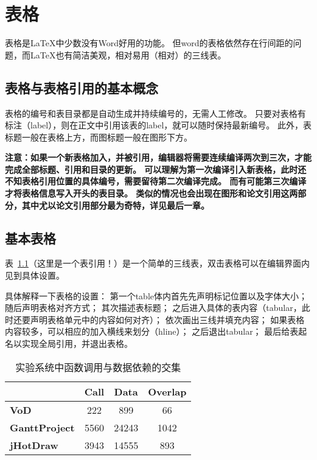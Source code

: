 \chapter{表格}

表格是LaTeX中少数没有Word好用的功能。
但word的表格依然存在行间距的问题，而LaTeX也有简洁美观，相对易用（相对）的三线表。

\section{表格与表格引用的基本概念}
表格的编号和表目录都是自动生成并持续编号的，无需人工修改。
只要对表格有标注（label），则在正文中引用该表的label，就可以随时保持最新编号。
此外，表标题一般在表格上方，而图标题一般在图形下方。

\textbf{注意：如果一个新表格加入，并被引用，编辑器将需要连续编译两次到三次，才能完成全部标题、引用和目录的更新。
可以理解为第一次编译引入新表格，此时还不知表格引用位置的具体编号，需要留待第二次编译完成。
而有可能第三次编译才将表格信息写入开头的表目录。
类似的情况也会出现在图形和论文引用这两部分，其中尤以论文引用部分最为奇特，详见最后一章。}

\section{基本表格}

表~\ref{table:codeOverlap}（这里是一个表引用！）是一个简单的三线表，双击表格可以在编辑界面内见到具体设置。

具体解释一下表格的设置：
第一个table体内首先先声明标记位置以及字体大小；
随后声明表格对齐方式；
其次描述表标题；
之后进入具体的表内容（tabular，此时还要声明表格单元中的内容如何对齐）；
依次画出三线并填充内容；
如果表格内容较多，可以相应的加入横线来划分（hline）；
之后退出tabular；
最后给表起名以实现全局引用，并退出表格。

\begin{table}[htb]\footnotesize
\centering
\caption{实验系统中函数调用与数据依赖的交集}
\vspace{2mm}
\begin{tabular}{lccc}
\toprule
&\textbf{Call}&\textbf{Data}&\textbf{Overlap}\\
\midrule
\textbf{VoD}&222&899&66\\
\textbf{GanttProject}&5560&24243&1042\\
\hline
\textbf{jHotDraw}&3943&14555&893\\
\bottomrule
\end{tabular}
\label{table:codeOverlap}
\end{table}

